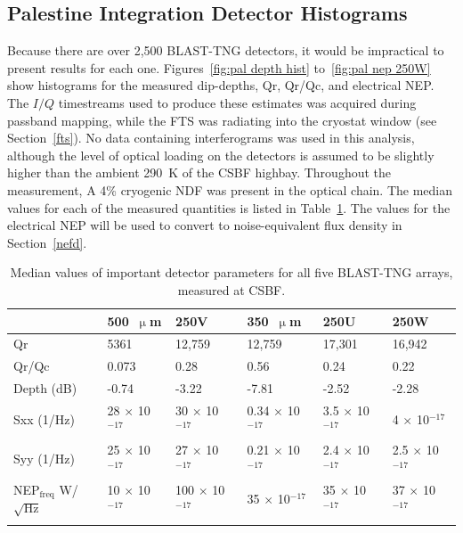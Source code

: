 \subsection{Palestine Integration Detector Histograms}\label{histograms}

Because there are over 2,500 BLAST-TNG detectors, it would be impractical to present results for each one. Figures~\ref{fig:pal depth hist} to~\ref{fig:pal nep 250W} show histograms for the measured dip-depths, \gls{Qr}, \gls{Qr}/\gls{Qc}, and electrical NEP\@. The $I/Q$ timestreams used to produce these estimates was acquired during passband mapping, while the FTS was radiating into the cryostat window (see Section~\ref{fts}). No data containing interferograms was used in this analysis, although the level of optical loading on the detectors is assumed to be slightly higher than the ambient 290~K of the CSBF highbay. Throughout the measurement, A 4\% cryogenic NDF was present in the optical chain. The median values for each of the measured quantities is listed in Table~\ref{table:palestine hists}. The values for the electrical NEP will be used to convert to noise-equivalent flux density in Section~\ref{nefd}.

\begin{table}[!htbp]
\centering
\caption[~Median values of important detector parameters for all five BLAST-TNG arrays, measured at CSBF.]{Median values of important detector parameters for all five BLAST-TNG arrays, measured at CSBF.}
\label{table:palestine hists}
\begin{tabular}{@{}llllll@{}}
\dtoprule{}
 & 500~$\upmu$m & 250V & 350~$\upmu$m & 250U & 250W \\ \midrule
\gls{Qr} & 5361 & 12,759 & 12,759 & 17,301 & 16,942 \\
\gls{Qr}/\gls{Qc} & 0.073 & 0.28 & 0.56 & 0.24 & 0.22 \\
Depth (dB) & -0.74 & -3.22 & -7.81 & -2.52 & -2.28 \\
\gls{Sxx} (1/Hz) & 28 $\times$ 10$^{-17}$ & 30 $\times$ 10$^{-17}$ & 0.34 $\times$ 10$^{-17}$ & 3.5 $\times$ 10$^{-17}$ & 4 $\times$ 10$^{-17}$ \\
\gls{Syy} (1/Hz) & 25 $\times$ 10$^{-17}$ & 27 $\times$ 10$^{-17}$ & 0.21 $\times$ 10$^{-17}$ & 2.4 $\times$ 10$^{-17}$ & 2.5 $\times$ 10$^{-17}$ \\
NEP$_{\mathrm{freq}}$ W/$\sqrt{\mathrm{Hz}}$ & 10 $\times$ 10$^{-17}$ & 100 $\times$ 10$^{-17}$ & 35 $\times$ 10$^{-17}$ & 35 $\times$ 10$^{-17}$ & 37 $\times$ 10$^{-17}$ \\ \dbottomrule{}
\\
\end{tabular}
\end{table}

